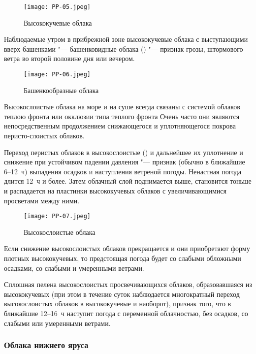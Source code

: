 \begin{figure}[htb]
  \centering{}
  \texttt{[image: PP-05.jpeg]}
  \caption{Высококучевые облака}
  \label{fig:pp05}
  \small
  \centering{}
\end{figure}

 Наблюдаемые утром в прибрежной зоне высококучевые облака с
выступающими вверх башенками "--- башенковидные облака () "--- признак
грозы, штормового ветра во второй половине дня или вечером.

\begin{figure}[htb]
  \centering{}
  \texttt{[image: PP-06.jpeg]}
  \caption{Башенкообразные облака}
  \label{fig:pp06}
  \small
  \centering{}
\end{figure}

Высокослоистые облака на море и на суше всегда связаны с системой
облаков теплою фронта или окклюзии типа теплого фронта Очень часто они
являются непосредственным продолжением снижающегося и уплотняющегося
покрова перисто-слоистых облаков.

 Переход перистых облаков в высокослоистые () и
дальнейшее их уплотнение и снижение при устойчивом падении
давления "--- признак (обычно в ближайшие 6--12~ч) выпадения
осадков и наступления ветреной погоды. Ненастная погода длится 12~ч и
более. Затем облачный слой поднимается выше, становится тоньше и
распадается на пластинки высококучевых облаков с увеличивающимися
просветами между ними.

\begin{figure}[htb]
  \centering{}
  \texttt{[image: PP-07.jpeg]}
  \caption{Высокослоистые облака}
  \label{fig:pp07}
  \small
  \centering{}
\end{figure}

 Если снижение высокослоистых облаков прекращается и они
приобретают форму плотных высококучевых, то предстоящая погода будет
со слабыми обложными осадками, со слабыми и умеренными ветрами.

 Сплошная пелена высокослоистых просвечивающихся облаков,
образовавшаяся из высококучевых (при этом в течение суток наблюдается
многократный переход высокослоистых облаков в высококучевые и
наоборот), признак того, что в ближайшие 12--16~ч наступит погода
с переменной облачностью, без осадков, со слабыми или умеренными
ветрами.

\subsubsection{Облака нижнего яруса}

